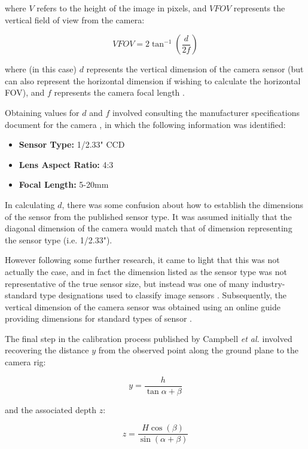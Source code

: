 where $ V $ refers to the height of the image in pixels, and $VFOV$ represents the vertical field of view from the camera:

\begin{equation}
	VFOV = 2\tan^{-1}(\frac{d}{2f})
\end{equation}

where (in this case) $d$ represents the vertical dimension of the camera sensor (but can also represent the horizontal dimension if wishing to calculate the horizontal FOV), and $f$ represents the camera focal length \cite{bourke}.

Obtaining values for $d$ and $f$ involved consulting the manufacturer specifications document for the camera \cite{camera-spec}, in which the following information was identified:

\begin{itemize}
	\item \textbf{Sensor Type:} 1/2.33" CCD
	\item \textbf{Lens Aspect Ratio:} 4:3
	\item \textbf{Focal Length:} 5-20mm 
\end{itemize}

In calculating $d$, there was some confusion about how to establish the dimensions of the sensor from the published sensor type. It was assumed initially that the diagonal dimension of the camera would match that of dimension representing the sensor type (i.e. 1/2.33"). 

However following some further research, it came to light that this was not actually the case, and in fact the dimension listed as the sensor type was not representative of the true sensor size, but instead was one of many industry-standard type designations used to classify image sensors \cite{gum}. Subsequently, the vertical dimension of the camera sensor was obtained using an online guide providing dimensions for standard types of sensor \cite{bockaert}.

The final step in the calibration process published by Campbell \textit{et al.} \cite{campbell} involved recovering the distance $y$ from the observed point along the ground plane to the camera rig:

\begin{equation}
	y = \frac{h}{\tan{\alpha + \beta}}
\end{equation}

and the associated depth $z$:

\begin{equation}
	z = \frac{H\cos(\beta)}{\sin(\alpha + \beta)} 
\end{equation}

